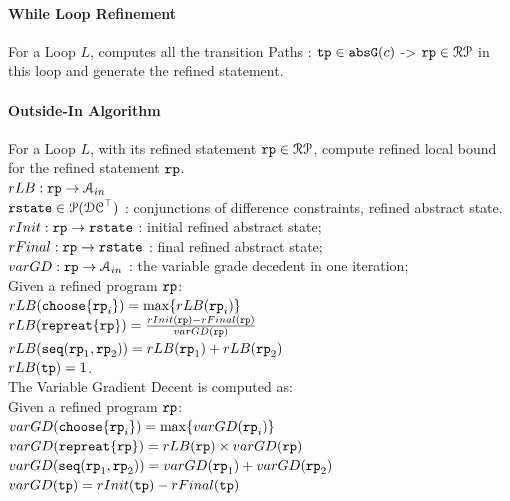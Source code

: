 \paragraph*{While Loop Refinement}
For a Loop $L$,
computes all the transition Paths : $\mathtt{tp} \in \mathtt{abs}{\mathtt{G}}(c)$
->  $\mathtt{rp} \in \mathcal{RP}$
in this loop and generate the refined statement.
\paragraph*{Outside-In Algorithm}
For a Loop $L$, with its refined statement $\mathtt{rp} \in \mathcal{RP}$,
compute refined local bound for the refined statement $\mathtt{rp}$.
\\
 $rLB: \mathtt{rp} \to \mathcal{A}_{in}$
\\
$\mathtt{rstate} \in \mathcal{P}(\mathcal{DC}^{\top})$ : conjunctions of difference constraints, refined abstract state.
\\
$rInit : \mathtt{rp} \to \mathtt{rstate} $ : initial refined abstract state;
\\
$rFinal : \mathtt{rp} \to \mathtt{rstate} $ : final refined abstract state;
\\
$varGD : \mathtt{rp} \to \mathcal{A}_{in}$ : the variable grade decedent in one iteration;
\\
Given a refined program $\mathtt{rp}$:
\\
$rLB(\mathtt{choose}\{\mathtt{rp}_i\}) =  \max\{rLB(\mathtt{rp}_i)\}$
\\
$rLB(\mathtt{repreat}\{\mathtt{rp}\}) =  \frac{rInit(\mathtt{rp}) - rFinal(\mathtt{rp})}{varGD(\mathtt{rp})}$
\\
$rLB(\mathtt{seq}(\mathtt{rp}_1, \mathtt{rp}_2)) =  rLB(\mathtt{rp}_1)+ rLB( \mathtt{rp}_2)$
\\
$rLB(\mathtt{tp}) =  1$.
\\
The Variable Gradient Decent is computed as:
\\
Given a refined program $\mathtt{rp}$:
\\
$varGD(\mathtt{choose}\{\mathtt{rp}_i\}) =  \max\{varGD(\mathtt{rp}_i)\}$
\\
$varGD(\mathtt{repreat}\{\mathtt{rp}\}) =  rLB(\mathtt{rp}) \times {varGD(\ensuremath{\mathtt{rp}})}$
\\
$varGD(\mathtt{seq}(\mathtt{rp}_1, \mathtt{rp}_2)) =  varGD(\mathtt{rp}_1)+ varGD( \mathtt{rp}_2)$
\\
$varGD(\mathtt{tp}) =  rInit(\mathtt{tp}) - rFinal(\mathtt{tp})$

